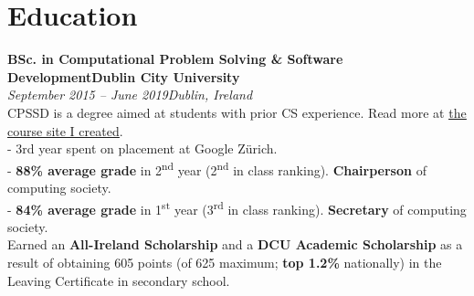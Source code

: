 \documentclass[a4paper, oneside, final]{scrartcl}
\newcommand{\nasc}[2]{\href{#1}{\color{blue}\setulcolor{blue}\ul{#2}}}
\newcommand{\bearna}[0]{\vspace{2.25mm}\\}
\newcommand{\fmtdate}[1]{\textit{#1}}
\newcommand{\fmtaddress}[1]{\textit{#1}}
\newcommand{\fmtjobtitle}[1]{\textbf{#1}}
\newcommand{\fmtskill}[1]{\textbf{#1}}
\begin{document}
\section{Education}
\fmtjobtitle{BSc. in Computational Problem Solving \& Software Development\hfill Dublin City University}\\
\fmtdate{September 2015 -- June 2019}\hfill\fmtaddress{Dublin, Ireland}\\
CPSSD is a degree aimed at students with prior CS experience. Read more at \nasc{https://cpssd.net}{the course site I created}.
\bearna
- 3rd year spent on placement at Google Zürich.\\
- \fmtskill{88\% average grade} in 2\textsuperscript{nd} year (2\textsuperscript{nd} in class ranking). \fmtskill{Chairperson} of computing society.\\
- \fmtskill{84\% average grade} in 1\textsuperscript{st} year (3\textsuperscript{rd} in class ranking). \fmtskill{Secretary} of computing society.
\bearna
Earned an \fmtskill{All-Ireland Scholarship} and a \fmtskill{DCU Academic Scholarship} as a result of obtaining 605 points (of 625 maximum; \fmtskill{top 1.2\%} nationally) in the Leaving Certificate in secondary school.
\end{document}

